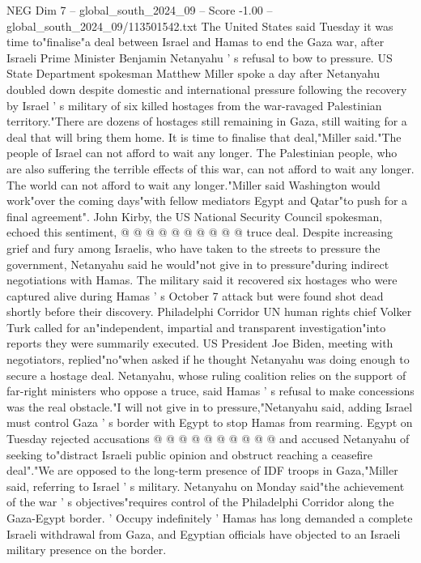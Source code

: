 \begin{textsample}{NEG Dim 7 – global\_south\_2024\_09 – Score -1.00 – global\_south\_2024\_09/113501542.txt}  \label{ex:f7_neg_228}
The United States said Tuesday it was time to"finalise"a deal between Israel and Hamas to end the Gaza war, after Israeli Prime Minister Benjamin Netanyahu ' s refusal to bow to pressure.
US State Department spokesman Matthew Miller spoke a day after Netanyahu doubled down despite domestic and international pressure following the recovery by Israel ' s military of six killed hostages from the war-ravaged Palestinian territory."There are dozens of hostages still remaining in Gaza, still waiting for a deal that will bring them home.
It is time to finalise that deal,"Miller said."The people of Israel can not afford to wait any longer.
The Palestinian people, who are also suffering the terrible effects of this war, can not afford to wait any longer.
The world can not afford to wait any longer."Miller said Washington would work"over the coming days"with fellow mediators Egypt and Qatar"to push for a final agreement".
John Kirby, the US National Security Council spokesman, echoed this sentiment, @ @ @ @ @ @ @ @ @ @ truce deal.
Despite increasing grief and fury among Israelis, who have taken to the streets to pressure the government, Netanyahu said he would"not give in to pressure"during indirect negotiations with Hamas.
The military said it recovered six hostages who were captured alive during Hamas ' s October 7 attack but were found shot dead shortly before their discovery.
Philadelphi Corridor UN human rights chief Volker Turk called for an"independent, impartial and transparent investigation"into reports they were summarily executed.
US President Joe Biden, meeting with negotiators, replied"no"when asked if he thought Netanyahu was doing enough to secure a hostage deal.
Netanyahu, whose ruling coalition relies on the support of far-right ministers who oppose a truce, said Hamas ' s refusal to make concessions was the real obstacle."I will not give in to pressure,"Netanyahu said, adding Israel must control Gaza ' s border with Egypt to stop Hamas from rearming.
Egypt on Tuesday rejected accusations @ @ @ @ @ @ @ @ @ @ and accused Netanyahu of seeking to"distract Israeli public opinion and obstruct reaching a ceasefire deal"."We are opposed to the long-term presence of IDF troops in Gaza,"Miller said, referring to Israel ' s military.
Netanyahu on Monday said"the achievement of the war ' s objectives"requires control of the Philadelphi Corridor along the Gaza-Egypt border. ' Occupy indefinitely ' Hamas has long demanded a complete Israeli withdrawal from Gaza, and Egyptian officials have objected to an Israeli military presence on the border.

\end{textsample}
